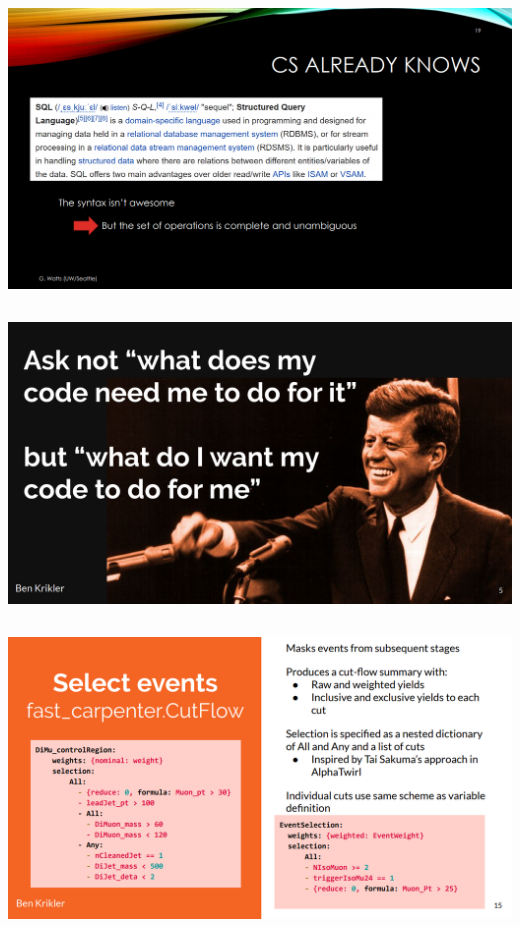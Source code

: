 \documentclass[aspectratio=169]{beamer}
\begin{document}
\begin{frame}{}
\vspace{-0.5 cm}
\begin{columns}
\includegraphics[width=\linewidth]{slides-06.png}
\end{columns}
\end{frame}

\begin{frame}{}
\vspace{-0.5 cm}
\begin{columns}
\includegraphics[width=\linewidth]{slides-07.png}
\end{columns}
\end{frame}

\begin{frame}{}
\vspace{-0.05 cm}
\begin{columns}
\includegraphics[width=\linewidth]{slides-08.png}
\end{columns}
\end{frame}
\end{document}
